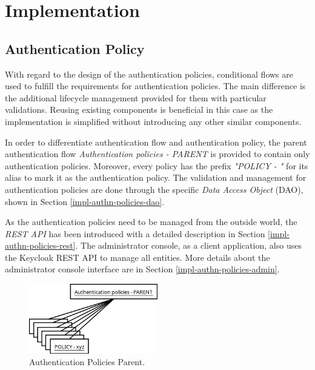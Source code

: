 \chapter{Implementation}

\section{Authentication Policy}
With regard to the design of the authentication policies, conditional flows are used to fulfill the requirements for authentication policies.
The main difference is the additional lifecycle management provided for them with particular validations.
Reusing existing components is beneficial in this case as the implementation is simplified without introducing any other similar components.

In order to differentiate authentication flow and authentication policy, the parent authentication flow \textit{Authentication policies - PARENT} is provided to contain only authentication policies.
Moreover, every policy has the prefix \textit{"POLICY - "} for its alias to mark it as the authentication policy.
The validation and management for authentication policies are done through the specific \textit{Data Access Object} (DAO), shown in Section \ref{impl-authn-policies-dao}. 

As the authentication policies need to be managed from the outside world, the \textit{REST API} has been introduced with a detailed description in Section \ref{impl-authn-policies-rest}.
The administrator console, as a client application, also uses the Keycloak REST API to manage all entities.
More details about the administrator console interface are in Section \ref{impl-authn-policies-admin}.

\begin{figure}[htbp]
  \centering
  \includegraphics[width=0.5\textwidth]{img/sections/6-implementation/auth-policies-parent.png}
  \caption{Authentication Policies Parent.}
  \label{fig:impl-authn-policies-parent}
\end{figure}

\newpage

